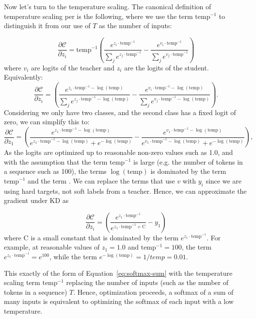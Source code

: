 \documentclass[twoside,11pt]{article}
\begin{document}
Now let's turn to the temperature scaling. The canonical definition of temperature scaling 
per \cite[Equation~2]{hinton2015distilling} is the following, where we use the term
$\mathrm{temp}^{-1}$ to distinguish it from our use of $T$ as the number
of inputs:

\[
\frac{\partial \mathcal{C}}{\partial z_i} = \mathrm{temp}^{-1} \left( 
\frac{e^{z_i \cdot \mathrm{temp}^{-1}}}{\sum_j e^{z_j \cdot \mathrm{temp}^{-1}}} 
- 
\frac{e^{v_i \cdot \mathrm{temp}^{-1}}}{\sum_j e^{v_j \cdot \mathrm{temp}^{-1}}} 
\right)
\] 
where $v_i$ are logits of the teacher and
$z_i$ are the logits of the student. Equivalently:
\[
\frac{\partial \mathcal{C}}{\partial z_i} = \left( 
\frac{e^{z_i \cdot \mathrm{temp}^{-1} - \log(\mathrm{temp})}}{\sum_j e^{z_j \cdot \mathrm{temp}^{-1} - \log(\mathrm{temp})}} 
- 
\frac{e^{v_i \cdot \mathrm{temp}^{-1} - \log(\mathrm{temp})}}{\sum_j e^{v_j \cdot \mathrm{temp}^{-1} - \log(\mathrm{temp})}} 
\right).
\]
Considering we only have two classes, and the second class has a fixed
logit of zero, we can simplify this to:
\[
\frac{\partial \mathcal{C}}{\partial z_1} 
= 
\left( 
\frac{e^{z_1 \cdot \mathrm{temp}^{-1} - \log(\mathrm{temp})}}{e^{z_1 \cdot \mathrm{temp}^{-1} - \log(\mathrm{temp})} + e^{-\log(\mathrm{temp})}} 
- 
\frac{e^{v_1 \cdot \mathrm{temp}^{-1} - \log(\mathrm{temp})}}{e^{v_1 \cdot \mathrm{temp}^{-1} - \log(\mathrm{temp})} + e^{-\log(\mathrm{temp})}} 
\right),
\]
As the logits are optimized up to reasonable non-zero values such as 1.0, 
and with
the assumption that the term $\mathrm{temp}^{-1}$ is large (e.g. the 
number of tokens in a sequence such as 100), 
the terms $\log(\mathrm{temp})$ is dominated
by the term $\mathrm{temp}^{-1}$ and the term . We can replace the terms that use $v$
with $y_i$ since we are using hard targets, not soft labels from a teacher. 
Hence, we can approximate the gradient under KD as

\begin{equation}
\frac{\partial \mathcal{C}}{\partial z_i} = \left( 
  \frac{e^{z_1 \cdot \mathrm{temp}^{-1} }}{e^{z_1 \cdot \mathrm{temp}^{-1} + \mathrm{C}}} 
  - 
y_1
\right)
\end{equation}
where $\mathrm{C}$ is a small constant that is dominated by the term 
$e^{z_1 \cdot \mathrm{temp}^{-1}}$. For example, at reasonable values of 
$z_1 = 1.0$ and $\mathrm{temp}^{-1} = 100$, the term 
$e^{z_1 \cdot \mathrm{temp}^{-1}} = e^{100}$, while the term
$e^{-\log(\mathrm{temp})} = 1 / temp = 0.01$. 

This exactly of the form of Equation~\ref{eq:softmax-sum} with the 
temperature scaling term $\mathrm{temp}^{-1}$ replacing the number of inputs 
(such as the number of tokens in a sequence) $T$.
Hence, optimization proceeds, a softmax of a sum of
many inputs is equivalent to optimizing the softmax of each input with
a low temperature. 
\end{document}
